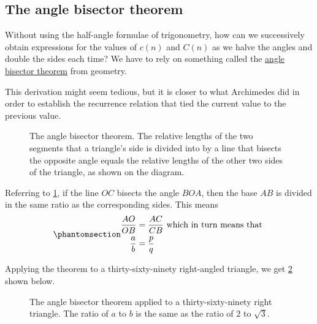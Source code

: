 \documentclass[
  a4paper,
]{article}
\begin{document}
\subsection{The angle bisector
theorem}\label{the-angle-bisector-theorem}

Without using the half-angle formulae of trigonometry, how can we
successively obtain expressions for the values of \(c(n)\) and \(C(n)\)
as we halve the angles and double the sides each time? We have to rely
on something called the
\href{https://en.wikipedia.org/wiki/Angle_bisector_theorem}{angle
bisector theorem} from geometry.

This derivation might seem tedious, but it is closer to what Archimedes
did in order to establish the recurrence relation that tied the current
value to the previous value.

\begin{figure}
\centering

\caption{The angle bisector theorem. The relative lengths of the two
segments that a triangle's side is divided into by a line that bisects
the opposite angle equals the relative lengths of the other two sides of
the triangle, as shown on the diagram.}\label{fig:angle-bisector}
\end{figure}

Referring to \cref{fig:angle-bisector}, if the line \(OC\) bisects the
angle \(BOA\), then the base \(AB\) is divided in the same ratio as the
corresponding sides. This means
\begin{equation}\phantomsection\label{eq:angle-bisector}{
\begin{aligned}
\frac{AO}{OB} &= \frac{AC}{CB} \mbox{ which in turn means that }\\
\frac{a}{b} &= \frac{p}{q}\\
\end{aligned}
}\end{equation}

Applying the theorem to a thirty-sixty-ninety right-angled triangle, we
get \cref{fig:bisect-thirty} shown below.

\begin{figure}
\centering

\caption{The angle bisector theorem applied to a thirty-sixty-ninety
right triangle. The ratio of \(a\) to \(b\) is the same as the ratio of
\(2\) to \(\sqrt{3}\).}\label{fig:bisect-thirty}
\end{figure}
\end{document}
